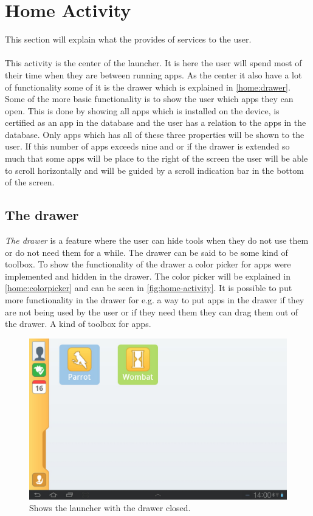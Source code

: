 \section{Home Activity}
This section will explain what the  provides of services to the user.\\\\
This activity is the center of the launcher. It is here the user will spend most of their time when they are between running apps. As the center it also have a lot of functionality some of it is the drawer which is explained in \autoref{home:drawer}. 
Some of the more basic functionality is to show the user which apps they can open. This is done by showing all apps which is installed on the device, is certified as an app in the database and the user has a relation to the apps in the database. Only apps which has all of these three properties will be shown to the user. If this number of apps exceeds nine and or if the drawer is extended so much that some apps will be place to the right of the screen the user will be able to scroll horizontally and will be guided by a scroll indication bar in the bottom of the screen.

\subsection{The drawer} \label{home:drawer}
\textit{The drawer} is a feature where the user can hide tools when they do not use them or do not need them for a while. The drawer can be said to be some kind of toolbox. To show the functionality of the drawer a color picker for apps were implemented and hidden in the drawer. The color picker will be explained in \autoref{home:colorpicker} and can be seen in \autoref{fig:home-activity}.
It is possible to put more functionality in the drawer for e.g. a way to put apps in the drawer if they are not being used by the user or if they need them they can drag them out of the drawer. A kind of toolbox for apps.

\begin{figure}[h!]
	\centering
	\includegraphics[scale=0.2]{gfx/home-activity_closed}
	\caption{Shows the launcher with the drawer closed.}
	\label{fig:home-activity_closed}
\end{figure}


